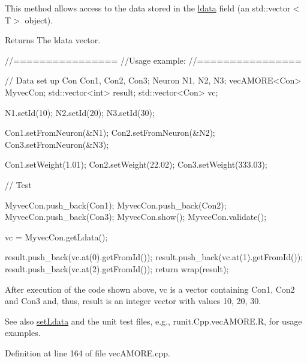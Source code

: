 This method allows access to the data stored in the \hyperlink{classvec_a_m_o_r_e_ab6a8dec6292a9e03a5566311d1eb650a}{ldata} field (an std::vector$<$T$>$ object). \begin{DoxyReturn}{Returns}
The ldata vector. 
\begin{DoxyCode}
        //================
        //Usage example:
        //================

        // Data set up
                Con Con1, Con2, Con3;
                Neuron N1, N2, N3;
                vecAMORE<Con> MyvecCon;
                std::vector<int> result;
                std::vector<Con> vc;

                N1.setId(10);
                N2.setId(20);
                N3.setId(30);

                Con1.setFromNeuron(&N1);
                Con2.setFromNeuron(&N2);
                Con3.setFromNeuron(&N3);

                Con1.setWeight(1.01);
                Con2.setWeight(22.02);
                Con3.setWeight(333.03);

        // Test

                MyvecCon.push_back(Con1);
                MyvecCon.push_back(Con2);
                MyvecCon.push_back(Con3);
                MyvecCon.show();
                MyvecCon.validate();

                vc = MyvecCon.getLdata();

                result.push_back(vc.at(0).getFromId());
                result.push_back(vc.at(1).getFromId());
                result.push_back(vc.at(2).getFromId());
                return wrap(result);
\end{DoxyCode}

\end{DoxyReturn}
After execution of the code shown above, vc is a vector containing Con1, Con2 and Con3 and, thus, result is an integer vector with values 10, 20, 30.

\begin{DoxySeeAlso}{See also}
\hyperlink{classvec_a_m_o_r_e_a13768303bf31bf7065a98015c00abc9f}{setLdata} and the unit test files, e.g., runit.Cpp.vecAMORE.R, for usage examples. 
\end{DoxySeeAlso}


Definition at line 164 of file vecAMORE.cpp.


